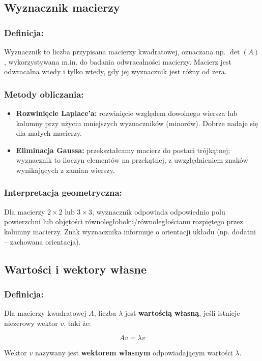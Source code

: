 \subsection{Wyznacznik macierzy}
\subsubsection*{Definicja:}
Wyznacznik to liczba przypisana macierzy kwadratowej, oznaczana np. $\det(A)$, wykorzystywana m.in. do badania odwracalności macierzy. Macierz jest odwracalna wtedy i tylko wtedy, gdy jej wyznacznik jest różny od zera.

\subsubsection*{Metody obliczania:}
\begin{itemize}
    \item \textbf{Rozwinięcie Laplace'a:} rozwinięcie względem dowolnego wiersza lub kolumny przy użyciu mniejszych wyznaczników (minorów). Dobrze nadaje się dla małych macierzy.
    \item \textbf{Eliminacja Gaussa:} przekształcamy macierz do postaci trójkątnej; wyznacznik to iloczyn elementów na przekątnej, z uwzględnieniem znaków wynikających z zamian wierszy.
\end{itemize}

\subsubsection*{Interpretacja geometryczna:}
Dla macierzy $2 \times 2$ lub $3 \times 3$, wyznacznik odpowiada odpowiednio polu powierzchni lub objętości równoległoboku/równoległościanu rozpiętego przez kolumny macierzy. Znak wyznacznika informuje o orientacji układu (np. dodatni -- zachowana orientacja).

\subsection{Wartości i wektory własne}
\subsubsection*{Definicja:}
Dla macierzy kwadratowej $A$, liczba $\lambda$ jest \textbf{wartością własną}, jeśli istnieje niezerowy wektor $v$, taki że:

$$
A v = \lambda v
$$

Wektor $v$ nazywany jest \textbf{wektorem własnym} odpowiadającym wartości $\lambda$.

